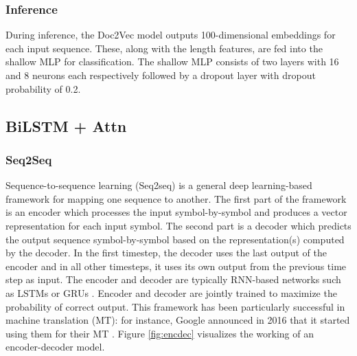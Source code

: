 \subsubsection{Inference} \label{subsubsec:d2vinference}
During inference, the Doc2Vec model outputs 100-dimensional embeddings for each input sequence. These, along with the length features, are fed into the shallow MLP for classification. The shallow MLP consists of two layers with 16 and 8 neurons each respectively followed by a dropout layer with dropout probability of 0.2.





\subsection{BiLSTM + Attn} \label{subsec:bilstm}
\subsubsection{Seq2Seq} \label{subsubsec:seq2seq}
Sequence-to-sequence learning (Seq2seq) \cite{seq2seq} is a general deep learning-based framework for mapping one sequence to another. The first part of the framework is an encoder which processes the input symbol-by-symbol and produces a vector representation for each input symbol. The second part is a decoder which predicts the output sequence symbol-by-symbol based on the representation(s) computed by the decoder. In the first timestep, the decoder uses the last output of the encoder and in all other timesteps, it uses its own output from the previous time step as input. The encoder and decoder are typically RNN-based networks such as LSTMs \cite{lstm} or GRUs \cite{gru}. Encoder and decoder are jointly trained to maximize the probability of correct output. This framework has been particularly successful in machine translation (MT): for instance, Google announced in 2016 that it started using them for their MT \cite{googlemt2016}. Figure \ref{fig:encdec} visualizes the working of an encoder-decoder model.

